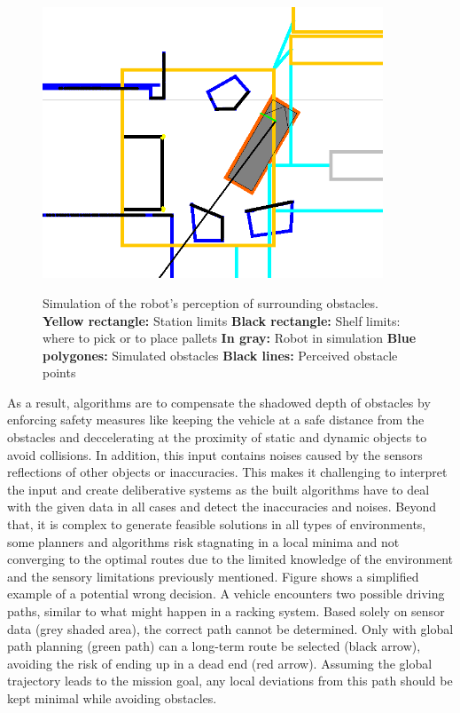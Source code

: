 \begin{figure}[H]
    \begin{center}
        \includegraphics[width=4in]{images/Chap1/scan.png}\\
        \caption{
        Simulation of the robot's perception of surrounding obstacles.
        \newline \textbf{Yellow rectangle:} Station limits
        \newline \textbf{Black rectangle:} Shelf limits: where to pick or to place pallets
        \newline \textbf{In gray:} Robot in simulation
        \newline \textbf{Blue polygones:} Simulated obstacles
        \newline \textbf{Black lines:} Perceived obstacle points}
        \label{scamSim}
        \end{center}
\end{figure}

As a result, algorithms are to compensate the shadowed depth of obstacles by enforcing safety measures like 
keeping the vehicle at a safe distance from the obstacles and deccelerating at the proximity 
of static and dynamic objects to avoid collisions.
In addition, this input contains noises caused by the sensors reflections of other objects
or inaccuracies. 
This makes it challenging to interpret the input and create deliberative systems as the built algorithms have to 
deal with the given data
in all cases and detect the inaccuracies and noises.
Beyond that, it is complex to generate feasible solutions in all types of environments,
some planners and algorithms risk stagnating in a local minima and not converging to the optimal routes
due to the limited knowledge of the environment and the sensory limitations previously mentioned. 
Figure  shows a simplified example of a potential wrong decision. A vehicle encounters two possible 
driving paths, similar to what might happen in a racking system. Based solely on sensor data 
(grey shaded area), the correct path cannot be determined. Only with global path planning (green path) 
can a long-term route be selected (black arrow), avoiding the risk of ending up in a dead end (red arrow). 
Assuming the global trajectory leads to the mission goal, any local deviations from this path should be 
kept minimal while avoiding obstacles.

